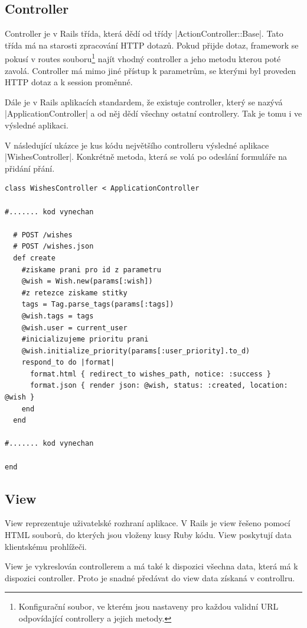 \subsection{Controller}
Controller je v Rails třída, která dědí od třídy |ActionController::Base|. Tato třída má na starosti zpracování HTTP dotazů. Pokud přijde dotaz, framework se pokusí v routes souboru\footnote{Konfigurační soubor, ve kterém jsou nastaveny pro každou validní URL odpovídající controllery a jejich metody.} najít vhodný controller a jeho metodu kterou poté zavolá. Controller má mimo jiné přístup k parametrům, se kterými byl proveden HTTP dotaz a k session proměnné.

Dále je v Rails aplikacích standardem, že existuje controller, který se nazývá |ApplicationController| a od něj dědí všechny ostatní controllery. Tak je tomu i ve výsledné aplikaci.

V následující ukázce je kus kódu největšího controlleru výsledné aplikace |WishesController|. Konkrétně metoda, která se volá po odeslání formuláře na přidání přání.

\lstset{language = ruby, style=custom}
\begin{lstlisting}
class WishesController < ApplicationController

#....... kod vynechan

  # POST /wishes
  # POST /wishes.json
  def create
    #ziskame prani pro id z parametru
    @wish = Wish.new(params[:wish])
    #z retezce ziskame stitky
    tags = Tag.parse_tags(params[:tags])
    @wish.tags = tags
    @wish.user = current_user
    #inicializujeme prioritu prani
    @wish.initialize_priority(params[:user_priority].to_d)
    respond_to do |format|
      format.html { redirect_to wishes_path, notice: :success }
      format.json { render json: @wish, status: :created, location: @wish }
    end
  end

#....... kod vynechan

end
\end{lstlisting}

\subsection{View}
View reprezentuje uživatelské rozhraní aplikace. V Rails je view řešeno pomocí HTML souborů, do kterých jsou vloženy kusy Ruby kódu. View poskytují data klientskému prohlížeči.

View je vykreslován controllerem a má také k dispozici všechna data, která má k dispozici controller. Proto je snadné předávat do view data získaná v controllru.

